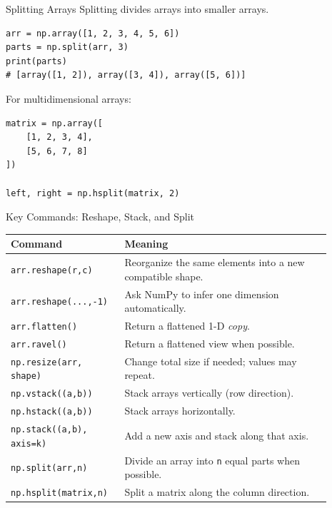 \documentclass[aspectratio=169,11pt]{beamer}
\begin{document}
\begin{frame}[fragile]{Splitting Arrays}
\small
Splitting divides arrays into smaller arrays.
\begin{lstlisting}[style=py]
arr = np.array([1, 2, 3, 4, 5, 6])
parts = np.split(arr, 3)
print(parts)
# [array([1, 2]), array([3, 4]), array([5, 6])]
\end{lstlisting}
For multidimensional arrays:
\begin{lstlisting}[style=py]
matrix = np.array([
    [1, 2, 3, 4],
    [5, 6, 7, 8]
])

left, right = np.hsplit(matrix, 2)
\end{lstlisting}
\end{frame}

\begin{frame}{Key Commands: Reshape, Stack, and Split}
\scriptsize
\begin{tabular}{p{0.29\linewidth}p{0.60\linewidth}}
\toprule
\textbf{Command} & \textbf{Meaning} \\
\midrule
\texttt{arr.reshape(r,c)} & Reorganize the same elements into a new compatible shape. \\
\texttt{arr.reshape(...,-1)} & Ask NumPy to infer one dimension automatically. \\
\texttt{arr.flatten()} & Return a flattened 1-D \emph{copy}. \\
\texttt{arr.ravel()} & Return a flattened view when possible. \\
\texttt{np.resize(arr, shape)} & Change total size if needed; values may repeat. \\
\texttt{np.vstack((a,b))} & Stack arrays vertically (row direction). \\
\texttt{np.hstack((a,b))} & Stack arrays horizontally. \\
\texttt{np.stack((a,b), axis=k)} & Add a new axis and stack along that axis. \\
\texttt{np.split(arr,n)} & Divide an array into \texttt{n} equal parts when possible. \\
\texttt{np.hsplit(matrix,n)} & Split a matrix along the column direction. \\
\bottomrule
\end{tabular}
\end{frame}
\end{document}
